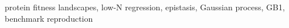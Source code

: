 protein fitness landscapes, low-N regression, epistasis, Gaussian process, GB1, benchmark reproduction
